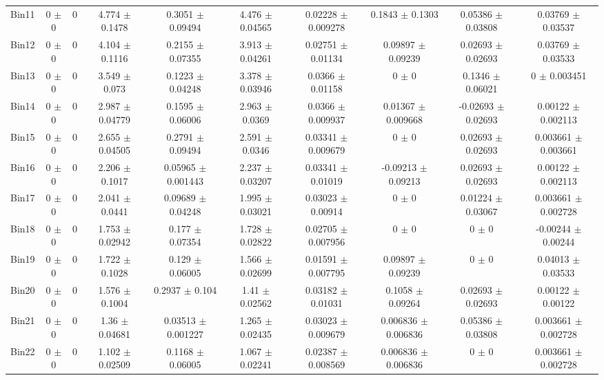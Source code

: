 \begin{tabular}{@{\extracolsep{4pt}}lccccccccc@{}}
     Bin11 & 0 $\pm$ 0 & 0 & 4.774 $\pm$ 0.1478 & 0.3051 $\pm$ 0.09494 & 4.476 $\pm$ 0.04565 & 0.02228 $\pm$ 0.009278 & 0.1843 $\pm$ 0.1303 & 0.05386 $\pm$ 0.03808 & 0.03769 $\pm$ 0.03537 \\ 
     Bin12 & 0 $\pm$ 0 & 0 & 4.104 $\pm$ 0.1116 & 0.2155 $\pm$ 0.07355 & 3.913 $\pm$ 0.04261 & 0.02751 $\pm$ 0.01134 & 0.09897 $\pm$ 0.09239 & 0.02693 $\pm$ 0.02693 & 0.03769 $\pm$ 0.03533 \\ 
     Bin13 & 0 $\pm$ 0 & 0 & 3.549 $\pm$ 0.073 & 0.1223 $\pm$ 0.04248 & 3.378 $\pm$ 0.03946 & 0.0366 $\pm$ 0.01158 & 0 $\pm$ 0 & 0.1346 $\pm$ 0.06021 & 0 $\pm$ 0.003451 \\ 
     Bin14 & 0 $\pm$ 0 & 0 & 2.987 $\pm$ 0.04779 & 0.1595 $\pm$ 0.06006 & 2.963 $\pm$ 0.0369 & 0.0366 $\pm$ 0.009937 & 0.01367 $\pm$ 0.009668 & -0.02693 $\pm$ 0.02693 & 0.00122 $\pm$ 0.002113 \\ 
     Bin15 & 0 $\pm$ 0 & 0 & 2.655 $\pm$ 0.04505 & 0.2791 $\pm$ 0.09494 & 2.591 $\pm$ 0.0346 & 0.03341 $\pm$ 0.009679 & 0 $\pm$ 0 & 0.02693 $\pm$ 0.02693 & 0.003661 $\pm$ 0.003661 \\ 
     Bin16 & 0 $\pm$ 0 & 0 & 2.206 $\pm$ 0.1017 & 0.05965 $\pm$ 0.001443 & 2.237 $\pm$ 0.03207 & 0.03341 $\pm$ 0.01019 & -0.09213 $\pm$ 0.09213 & 0.02693 $\pm$ 0.02693 & 0.00122 $\pm$ 0.002113 \\ 
     Bin17 & 0 $\pm$ 0 & 0 & 2.041 $\pm$ 0.0441 & 0.09689 $\pm$ 0.04248 & 1.995 $\pm$ 0.03021 & 0.03023 $\pm$ 0.00914 & 0 $\pm$ 0 & 0.01224 $\pm$ 0.03067 & 0.003661 $\pm$ 0.002728 \\ 
     Bin18 & 0 $\pm$ 0 & 0 & 1.753 $\pm$ 0.02942 & 0.177 $\pm$ 0.07354 & 1.728 $\pm$ 0.02822 & 0.02705 $\pm$ 0.007956 & 0 $\pm$ 0 & 0 $\pm$ 0 & -0.00244 $\pm$ 0.00244 \\ 
     Bin19 & 0 $\pm$ 0 & 0 & 1.722 $\pm$ 0.1028 & 0.129 $\pm$ 0.06005 & 1.566 $\pm$ 0.02699 & 0.01591 $\pm$ 0.007795 & 0.09897 $\pm$ 0.09239 & 0 $\pm$ 0 & 0.04013 $\pm$ 0.03533 \\ 
     Bin20 & 0 $\pm$ 0 & 0 & 1.576 $\pm$ 0.1004 & 0.2937 $\pm$ 0.104 & 1.41 $\pm$ 0.02562 & 0.03182 $\pm$ 0.01031 & 0.1058 $\pm$ 0.09264 & 0.02693 $\pm$ 0.02693 & 0.00122 $\pm$ 0.00122 \\ 
     Bin21 & 0 $\pm$ 0 & 0 & 1.36 $\pm$ 0.04681 & 0.03513 $\pm$ 0.001227 & 1.265 $\pm$ 0.02435 & 0.03023 $\pm$ 0.009679 & 0.006836 $\pm$ 0.006836 & 0.05386 $\pm$ 0.03808 & 0.003661 $\pm$ 0.002728 \\ 
     Bin22 & 0 $\pm$ 0 & 0 & 1.102 $\pm$ 0.02509 & 0.1168 $\pm$ 0.06005 & 1.067 $\pm$ 0.02241 & 0.02387 $\pm$ 0.008569 & 0.006836 $\pm$ 0.006836 & 0 $\pm$ 0 & 0.003661 $\pm$ 0.002728 \\ 

\end{tabular}
